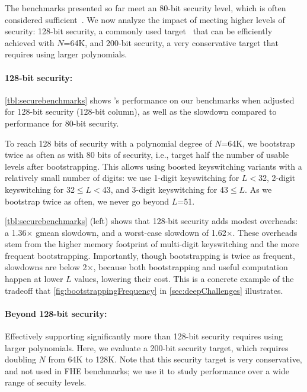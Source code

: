 The benchmarks presented so far meet an 80-bit security level,
which is often considered sufficient~\cite{feldmann:micro21:f1,halevi2021bootstrapping,halevi2018faster,izabachene2019practical,ji2019efficient}.
We now analyze the impact of meeting higher levels of security:
128-bit security, a commonly used target~\cite{albrecht:hesg18:standard,lee:2021:privacy,riazi:asplos20:heax}
that can be efficiently achieved with $N$=64K,
and 200-bit security, a very conservative target
that requires using larger polynomials.

\paragraph{128-bit security:}
\autoref{tbl:securebenchmarks} shows \name's performance on our benchmarks when
adjusted for 128-bit security (128-bit column), as
well as the slowdown compared to performance for 80-bit security.

\tblSecureBenchmarks

To reach 128 bits of security with a polynomial degree of $N$=64K,
we bootstrap twice as often as with 80 bits of security, i.e., target half
the number of usable levels after bootstrapping. This allows using boosted
keyswitching variants with a relatively small number of digits: we use 1-digit
keyswitching for $L<$32, 2-digit
keyswitching for 32$\leq L<$43, and 3-digit keyswitching for 43$\leq L$. As we
bootstrap twice as often, we never go beyond $L$=51.

\autoref{tbl:securebenchmarks} (left) shows that 128-bit security adds modest overheads:
a 1.36$\times$ gmean slowdown, and a worst-case slowdown of 1.62$\times$.
These overheads stem from the higher memory footprint of multi-digit keyswitching
and the more frequent bootstrapping.
Importantly, though bootstrapping is twice as frequent,
slowdowns are below 2$\times$, because both bootstrapping and useful computation happen at lower $L$ values, lowering their cost.
This is a concrete example of the tradeoff that \autoref{fig:bootstrappingFrequency} in \autoref{sec:deepChallenges} illustrates.

\paragraph{Beyond 128-bit security:}
Effectively supporting significantly more than 128-bit security
requires using larger polynomials. 
Here, we evaluate a 200-bit security target, which requires doubling $N$ from 64K to 128K.
Note that this security target is very conservative, and not used in FHE benchmarks;
we use it to study performance over a wide range of secuity levels.

